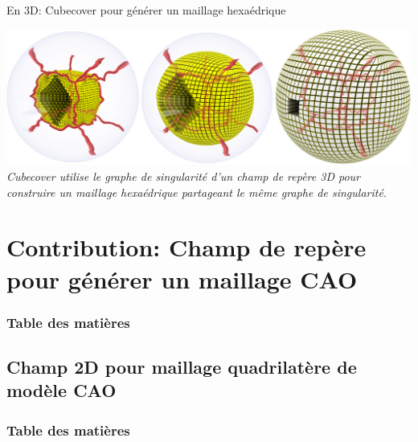 \documentclass{beamer}
\begin{document}
\begin{frame}{En 3D: Cubecover pour générer un maillage hexaédrique}
    \begin{center}
        \includegraphics[width=\linewidth]{img/cubecover/B34_graphe_interieur.PNG}
        \small{
            \textit{Cubecover utilise le graphe de singularité d'un champ de repère 3D pour construire un maillage hexaédrique partageant le même graphe de singularité.}
        }
    \end{center}
\end{frame}
\section{Contribution: Champ de repère pour générer un maillage CAO }
\begin{frame}
    \frametitle{Table des matières}
    \tableofcontents[currentsection, sectionstyle=show/shaded, subsectionstyle=show/show/hide]
\end{frame}
\subsection{Champ 2D pour maillage quadrilatère de modèle CAO}
\begin{frame}
    \frametitle{Table des matières}
    \tableofcontents[currentsubsection, sectionstyle=show/shaded, subsectionstyle=show/shaded/hide]
\end{frame}
\end{document}
